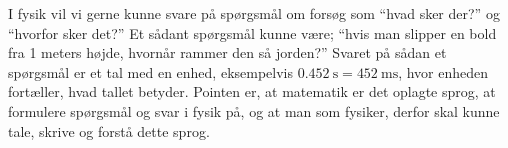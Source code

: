 I fysik vil vi gerne kunne svare på spørgsmål om forsøg som ``hvad sker der?'' og ``hvorfor sker det?'' Et sådant spørgsmål kunne være; ``hvis man slipper en bold fra 1 meters højde, hvornår rammer den så jorden?'' Svaret på sådan et spørgsmål er et tal med en enhed, eksempelvis $\SI{0.452}{\second} = \SI{452}{\milli\second}$, hvor enheden fortæller, hvad tallet betyder. Pointen er, at matematik er det oplagte sprog, at formulere spørgsmål og svar i fysik på, og at man som fysiker, derfor skal kunne tale, skrive og forstå dette sprog.


